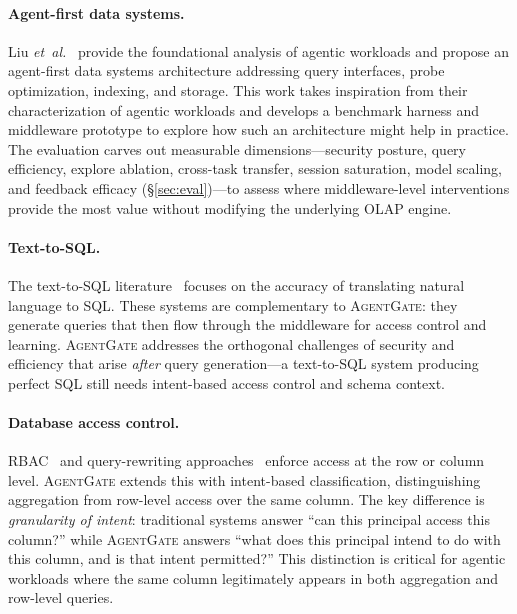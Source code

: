 \documentclass[sigconf, nonacm]{acmart}
\newcommand{\sysname}{\textsc{AgentGate}\xspace}  %
\newcommand{\etal}{\textit{et~al.}\xspace}
\begin{document}
\paragraph{Agent-first data systems.}
Liu \etal~\cite{liu2025sao} provide the foundational analysis of agentic
workloads and propose an agent-first data systems architecture addressing
query interfaces, probe optimization, indexing, and storage.  This work
takes inspiration from their characterization of agentic workloads and
develops a benchmark harness and middleware prototype to explore how such
an architecture might help in practice.  The evaluation carves out
measurable dimensions---security posture, query efficiency, explore
ablation, cross-task transfer, session saturation, model scaling, and
feedback efficacy (\S\ref{sec:eval})---to assess where middleware-level
interventions provide the most value without modifying the underlying
OLAP engine.

\paragraph{Text-to-SQL.}
The text-to-SQL literature~\cite{yu2018spider,li2024bird,pourreza2024dinsql}
focuses on the accuracy of translating natural language to SQL.  These systems
are complementary to \sysname: they generate queries that then flow through
the middleware for access control and learning.  \sysname addresses the
orthogonal challenges of security and efficiency that arise \emph{after}
query generation---a text-to-SQL system producing perfect SQL still needs
intent-based access control and schema context.

\paragraph{Database access control.}
RBAC~\cite{sandhu1996rbac} and query-rewriting
approaches~\cite{rizvi2004extending} enforce access at the row or column
level.  \sysname extends this with intent-based classification,
distinguishing aggregation from row-level access over the same column.
The key difference is \emph{granularity of intent}: traditional systems
answer ``can this principal access this column?'' while \sysname answers
``what does this principal intend to do with this column, and is that
intent permitted?''  This distinction is critical for agentic workloads
where the same column legitimately appears in both aggregation and
row-level queries.
\end{document}
